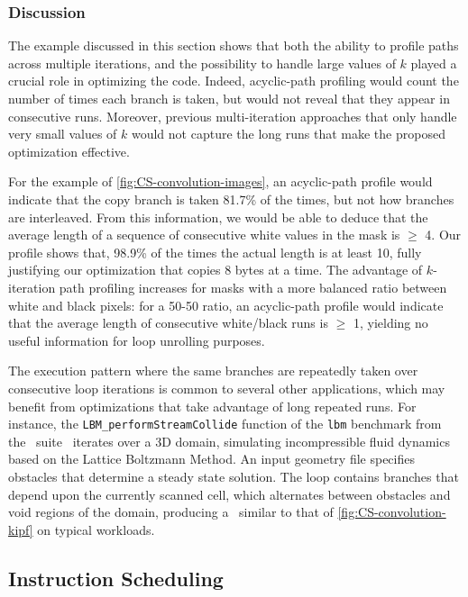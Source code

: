 \subsubsection*{Discussion}
The example discussed in this section shows that both the ability to profile paths across multiple iterations, and the possibility to handle large values of $k$ played a crucial role in optimizing the code. Indeed, acyclic-path profiling would count the number of times each branch is taken, but would not reveal that they appear in consecutive runs. Moreover, previous multi-iteration approaches that only handle very small values of $k$ would not capture the long runs that make the proposed optimization effective. 

For the example of \myfigure\ref{fig:CS-convolution-images}, an acyclic-path profile would indicate that the copy branch is taken 81.7\% of the times, but not how branches are interleaved. From this information, we would be able to deduce that the average length of a sequence of consecutive white values in the mask is $\ge$ 4. Our profile shows that, 98.9\% of the times the actual length is at least 10, fully justifying our optimization that copies 8 bytes at a time. The advantage of $k$-iteration path profiling increases for masks with a more balanced ratio between white and black pixels: for a 50-50 ratio, an acyclic-path profile would indicate that the average length of consecutive white/black runs is $\ge$ 1, yielding no useful information for loop unrolling purposes.

The execution pattern where the same branches are repeatedly taken over consecutive loop iterations is common to several other applications, which may benefit from optimizations that take advantage of long repeated runs. For instance, the {\tt LBM\_performStreamCollide} function of the {\tt lbm} benchmark from the \speccpu\ suite~\cite{Henning06}  iterates over a 3D domain, simulating incompressible fluid dynamics based on the Lattice Boltzmann Method. An input geometry file specifies obstacles that determine a steady state solution. The loop contains branches that depend upon the currently scanned cell, which alternates between obstacles and void regions of the domain, producing a \kipf\ similar to that of \myfigure\ref{fig:CS-convolution-kipf} on typical workloads.

\subsection{Instruction Scheduling}
\label{ss:instr-scheduling}

